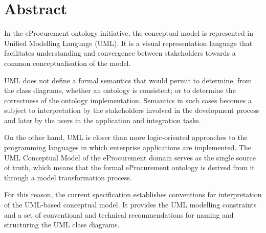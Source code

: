 \section*{Abstract}

	In the eProcurement ontology initiative, the conceptual model is represented in Unified Modelling Language (UML). It is a visual representation language that facilitates understanding and convergence between stakeholders towards a common conceptualisation of the model.
	
	UML does not define a formal semantics that would permit to determine, from the class diagrams, whether an ontology is consistent; or to determine the correctness of the ontology implementation. Semantics in such cases becomes a subject to interpretation by the stakeholders involved in the development process and later by the users in the application and integration tasks.
	
	On the other hand, UML is closer than more logic-oriented approaches to the programming languages in which enterprise applications are implemented. The UML Conceptual Model of the eProcurement domain serves as the single source of truth, which means that the formal eProcurement ontology is derived from it through a model transformation process.
	
	For this reason, the current specification establishes conventions for interpretation of the UML-based conceptual model. It provides the UML modelling constraints and a set of conventional and technical recommendations for naming and structuring the UML class diagrams.
	
	